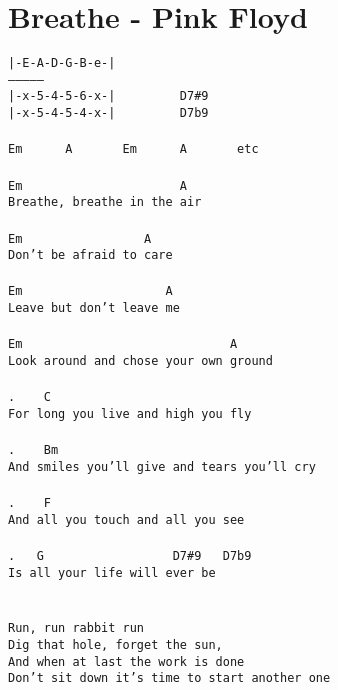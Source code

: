 \newpage
\section{Breathe - Pink Floyd}
\label{Breathe - Pink Floyd}
\texttt{|-E-A-D-G-B-e-|\\
---------------\\
|-x-5-4-5-6-x-|  \ \ \ \ \ \ \ \ D7\#9\\
|-x-5-4-5-4-x-|  \ \ \ \ \ \ \ \ D7b9\\
\\
Em\ \ \ \ \ \ A\ \ \ \ \ \ \ Em\ \ \ \ \ \ A\ \ \ \ \ \ \ etc\\
\\
Em\ \ \ \ \ \ \ \ \ \ \ \ \ \ \ \ \ \ \ \ \ \ A\\
Breathe,\ breathe\ in\ the\ air\\
\\
Em\ \ \ \ \ \ \ \ \ \ \ \ \ \ \ \ \ A\\
Don't\ be\ afraid\ to\ care\\
\\
Em\ \ \ \ \ \ \ \ \ \ \ \ \ \ \ \ \ \ \ \ A\\
Leave\ but\ don't\ leave\ me\\
\\
Em\ \ \ \ \ \ \ \ \ \ \ \ \ \ \ \ \ \ \ \ \ \ \ \ \ \ \ \ \ A\\
Look\ around\ and\ chose\ your\ own\ ground\\
\\
.\ \ \ \ C\\
For\ long\ you\ live\ and\ high\ you\ fly\\
\\
.\ \ \ \ Bm\\
And\ smiles\ you'll\ give\ and\ tears\ you'll\ cry\\
\\
.\ \ \ \ F\\
And\ all\ you\ touch\ and\ all\ you\ see\\
\\
.\ \ \ G\ \ \ \ \ \ \ \ \ \ \ \ \ \ \ \ \ \ D7\#9\ \ \ D7b9\\
Is\ all\ your\ life\ will\ ever\ be\\
\\
\\
Run,\ run\ rabbit\ run\\
Dig\ that\ hole,\ forget\ the\ sun,\\
And\ when\ at\ last\ the\ work\ is\ done\\
Don't\ sit\ down\ it's\ time\ to\ start\ another\ one\\
}

